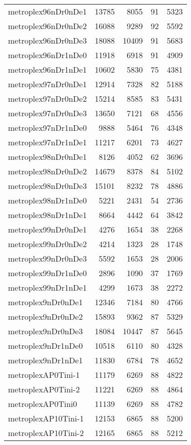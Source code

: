 \begin{longtable}{lrrrr}
metroplex96nDr0nDe1 & 13785 & 8055 & 91 & 5323 \\
metroplex96nDr0nDe2 & 16088 & 9289 & 92 & 5592 \\
metroplex96nDr0nDe3 & 18088 & 10409 & 91 & 5683 \\
metroplex96nDr1nDe0 & 11918 & 6918 & 91 & 4909 \\
metroplex96nDr1nDe1 & 10602 & 5830 & 75 & 4381 \\
metroplex97nDr0nDe1 & 12914 & 7328 & 82 & 5188 \\
metroplex97nDr0nDe2 & 15214 & 8585 & 83 & 5431 \\
metroplex97nDr0nDe3 & 13650 & 7121 & 68 & 4556 \\
metroplex97nDr1nDe0 & 9888 & 5464 & 76 & 4348 \\
metroplex97nDr1nDe1 & 11217 & 6201 & 73 & 4627 \\
metroplex98nDr0nDe1 & 8126 & 4052 & 62 & 3696 \\
metroplex98nDr0nDe2 & 14679 & 8378 & 84 & 5102 \\
metroplex98nDr0nDe3 & 15101 & 8232 & 78 & 4886 \\
metroplex98nDr1nDe0 & 5221 & 2431 & 54 & 2736 \\
metroplex98nDr1nDe1 & 8664 & 4442 & 64 & 3842 \\
metroplex99nDr0nDe1 & 4276 & 1654 & 38 & 2268 \\
metroplex99nDr0nDe2 & 4214 & 1323 & 28 & 1748 \\
metroplex99nDr0nDe3 & 5592 & 1653 & 28 & 2006 \\
metroplex99nDr1nDe0 & 2896 & 1090 & 37 & 1769 \\
metroplex99nDr1nDe1 & 4299 & 1673 & 38 & 2272 \\
metroplex9nDr0nDe1 & 12346 & 7184 & 80 & 4766 \\
metroplex9nDr0nDe2 & 15893 & 9362 & 87 & 5329 \\
metroplex9nDr0nDe3 & 18084 & 10447 & 87 & 5645 \\
metroplex9nDr1nDe0 & 10518 & 6110 & 80 & 4328 \\
metroplex9nDr1nDe1 & 11830 & 6784 & 78 & 4652 \\
metroplexAP0Tini-1 & 11179 & 6269 & 88 & 4822 \\
metroplexAP0Tini-2 & 11221 & 6269 & 88 & 4864 \\
metroplexAP0Tini0 & 11139 & 6269 & 88 & 4782 \\
metroplexAP10Tini-1 & 12153 & 6865 & 88 & 5200 \\
metroplexAP10Tini-2 & 12165 & 6865 & 88 & 5212 \\

\end{longtable}
